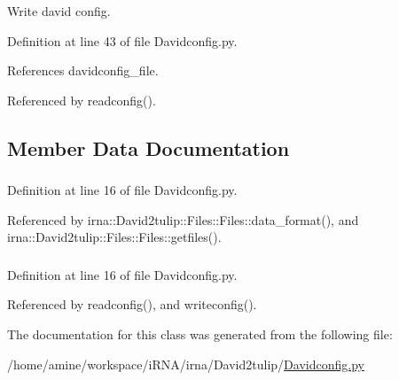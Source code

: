 \-Write david config. 



\-Definition at line 43 of file \-Davidconfig.\-py.



\-References davidconfig\-\_\-file.



\-Referenced by readconfig().



\subsection{\-Member \-Data \-Documentation}
\hypertarget{classirna_1_1David2tulip_1_1Davidconfig_1_1Davidconfig_a62d0e46b666000d50dde2cbc7a60f484}{
\subsubsection[{config}]{}}
\label{classirna_1_1David2tulip_1_1Davidconfig_1_1Davidconfig_a62d0e46b666000d50dde2cbc7a60f484}


\-Definition at line 16 of file \-Davidconfig.\-py.



\-Referenced by irna\-::\-David2tulip\-::\-Files\-::\-Files\-::data\-\_\-format(), and irna\-::\-David2tulip\-::\-Files\-::\-Files\-::getfiles().

\hypertarget{classirna_1_1David2tulip_1_1Davidconfig_1_1Davidconfig_a6a261c69b8063bd4be23e93a7e213c41}{
\subsubsection[{davidconfig\-\_\-file}]{}}
\label{classirna_1_1David2tulip_1_1Davidconfig_1_1Davidconfig_a6a261c69b8063bd4be23e93a7e213c41}


\-Definition at line 16 of file \-Davidconfig.\-py.



\-Referenced by readconfig(), and writeconfig().



\-The documentation for this class was generated from the following file\-:\begin{DoxyCompactItemize}
\item 
/home/amine/workspace/i\-R\-N\-A/irna/\-David2tulip/\hyperlink{Davidconfig_8py}{\-Davidconfig.\-py}\end{DoxyCompactItemize}
